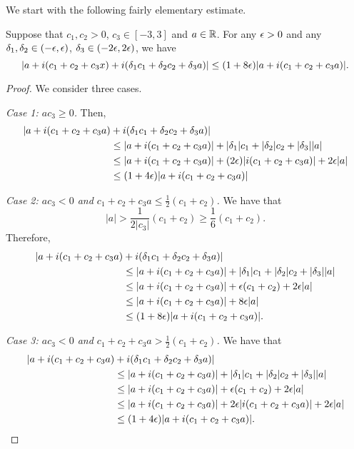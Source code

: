 \documentclass{amsart}
\begin{document}

We start with the following fairly elementary estimate.

\begin{lemma}\label{lem:estimate}
Suppose that $c_1,c_2 >0$, $c_3\in [-3,3]$ and $a\in \mathbb{R}$. For any $\epsilon>0$ and any $\delta_1,\delta_2 \in (-\epsilon,\epsilon)$, $\delta_3\in (-2\epsilon,2\epsilon)$, we have
\[ |a+ i(c_1+c_2+c_3x) + i(\delta_1c_1+\delta_2c_2+\delta_3a)| \leq (1+8\epsilon)|a+ i(c_1+c_2+c_3a)|.\]
\end{lemma}

\begin{proof}
We consider three cases.

\emph{Case 1: $ac_3\geq 0$.} Then,
\begin{align*} 
 |a+ i(c_1+c_2+c_3a) &+ i(\delta_1c_1+\delta_2c_2+\delta_3a)|\\ 
 &\leq |a+ i(c_1+c_2+c_3a)| + |\delta_1|c_1+|\delta_2|c_2+|\delta_3||a|\\
 &\leq |a+ i(c_1+c_2+c_3a)| +(2\epsilon)|i(c_1+c_2+c_3a)| + 2\epsilon|a|\\
 &\leq (1+4\epsilon)|a+ i(c_1+c_2+c_3a)|
\end{align*}

\emph{Case 2: $ac_3< 0$ and $c_1+c_2+c_3a\leq \frac12(c_1+c_2)$.} We have that 
\[ |a| > \frac1{2|c_3|}(c_1+c_2) \geq \frac16(c_1+c_2).\] 
Therefore,
\begin{align*}
|a+ i(c_1+c_2+c_3a) &+ i(\delta_1c_1+\delta_2c_2+\delta_3a)|\\
&\leq |a+ i(c_1+c_2+c_3a)| + |\delta_1|c_1+|\delta_2|c_2+|\delta_3||a|\\
&\leq |a+ i(c_1+c_2+c_3a)| + \epsilon(c_1+c_2) + 2\epsilon |a| \\
&\leq  |a+ i(c_1+c_2+c_3a)| + 8\epsilon|a|\\
&\leq (1+8\epsilon)|a+ i(c_1+c_2+c_3a)|.
\end{align*}

\emph{Case 3: $ac_3< 0$ and $c_1+c_2+c_3a> \frac12(c_1+c_2)$.} We have that 
\begin{align*}
|a+ i(c_1+c_2+c_3a) &+ i(\delta_1c_1+\delta_2c_2+\delta_3a)|\\
&\leq |a+ i(c_1+c_2+c_3a)| + |\delta_1|c_1+|\delta_2|c_2+|\delta_3||a|\\
&\leq |a+ i(c_1+c_2+c_3a)| + \epsilon(c_1+c_2) + 2\epsilon|a|\\
&\leq |a+ i(c_1+c_2+c_3a)| + 2\epsilon|i(c_1+c_2+c_3a)| + 2\epsilon|a|\\
&\leq (1+4\epsilon)|a+ i(c_1+c_2+c_3a)|. \qedhere
\end{align*}
\end{proof}
\end{document}
